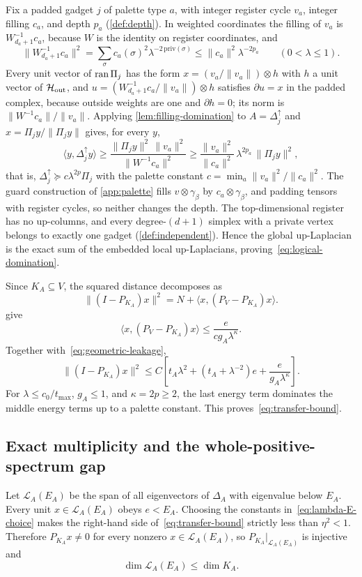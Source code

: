 Fix a padded gadget \(j\) of palette type \(a\), with integer register cycle
\(v_a\), integer filling \(c_a\), and depth \(p_a\) (\cref{def:depth}).  In
weighted coordinates the filling of \(v_a\) is \(W_{d_a+1}^{-1}c_a\), because
\(W\) is the identity on register coordinates, and
\[
\|W_{d_a+1}^{-1}c_a\|^2=\sum_\sigma c_a(\sigma)^2\lambda^{-2\,\mathrm{priv}(\sigma)}
\le\|c_a\|^2\lambda^{-2p_a}\qquad(0<\lambda\le1).
\]
Every unit vector of \(\operatorname{ran}\Pi_j\) has the form \(x=(v_a/\|v_a\|)\otimes h\)
with \(h\) a unit vector of \(\mathcal{H}_{\rm out}\), and
\(u=(W_{d_a+1}^{-1}c_a/\|v_a\|)\otimes h\) satisfies \(\partial u=x\) in the
padded complex, because outside weights are one and \(\partial h=0\); its norm
is \(\|W^{-1}c_a\|/\|v_a\|\).  Applying \cref{lem:filling-domination} to
\(A=\Delta_j^\uparrow\) and \(x=\Pi_jy/\|\Pi_jy\|\) gives, for every \(y\),
\[
\langle y,\Delta_j^\uparrow y\rangle\ge
\frac{\|\Pi_jy\|^2\,\|v_a\|^2}{\|W^{-1}c_a\|^2}
\ge\frac{\|v_a\|^2}{\|c_a\|^2}\,\lambda^{2p_a}\,\|\Pi_jy\|^2,
\]
that is, \(\Delta_j^\uparrow\succeq c\lambda^{2p}\Pi_j\) with the palette
constant \(c=\min_a\|v_a\|^2/\|c_a\|^2\).  The guard construction of
\cref{app:palette} fills \(v\otimes\gamma_\beta\) by \(c_a\otimes\gamma_\beta\),
and padding tensors with register cycles, so neither changes the depth.
The top-dimensional register has no up-columns, and every
degree-\((d+1)\) simplex with a private vertex belongs to exactly one
gadget (\cref{def:independent}).  Hence the global up-Laplacian is the exact
sum of the embedded local up-Laplacians, proving~\cref{eq:logical-domination}.

Since \(K_A\subseteq V\), the squared distance decomposes as
\[
\|(I-P_{K_A})x\|^2
=N+\langle x,(P_V-P_{K_A})x\rangle.
\]
 give
\[
\langle x,(P_V-P_{K_A})x\rangle
\le\frac{e}{cg_A\lambda^\kappa}.
\]
Together with~\cref{eq:geometric-leakage},
\[
\|(I-P_{K_A})x\|^2
\le C\left[t_A\lambda^2+(t_A+\lambda^{-2})e
+\frac{e}{g_A\lambda^\kappa}\right].
\]
For \(\lambda\le c_0/t_{\max}\), \(g_A\le1\), and \(\kappa=2p\ge2\), the last energy term dominates the middle energy terms up to a palette constant. This proves~\cref{eq:transfer-bound}.

\subsection{Exact multiplicity and the whole-positive-spectrum gap}

Let \(\mathcal L_A(E_A)\) be the span of all eigenvectors of \(\Delta_A\) with eigenvalue below \(E_A\). Every unit \(x\in\mathcal L_A(E_A)\) obeys \(e<E_A\). Choosing the constants in~\cref{eq:lambda-E-choice} makes the right-hand side of~\cref{eq:transfer-bound} strictly less than \(\eta^2<1\). Therefore \(P_{K_A}x\neq0\) for every nonzero \(x\in\mathcal L_A(E_A)\), so \(P_{K_A}|_{\mathcal L_A(E_A)}\) is injective and
\begin{equation}
\label{eq:low-dimension}
\dim\mathcal L_A(E_A)\le\dim K_A.
\end{equation}

